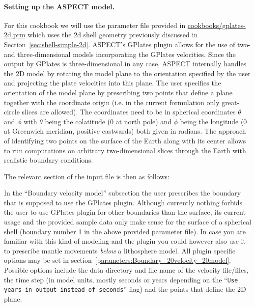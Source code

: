 \documentclass{article}
\newcommand{\aspect}{\textsc{ASPECT}}
\begin{document}
\paragraph{Setting up the \aspect{} model.}

For this cookbook we will use the parameter file provided in
\url{cookbooks/gplates-2d.prm} which uses the 2d shell geometry previously
discussed in Section~\ref{sec:shell-simple-2d}. \aspect{}'s GPlates plugin
allows for the use of two- and three-dimensional models incorporating the
GPlates velocities. Since the output by GPlates is three-dimensional in any case,
\aspect{} internally handles the 2D model by rotating the model plane to the
orientation specified by the user and projecting the plate velocities into this plane. The
user specifies the orientation of the model plane by prescribing two points that
define a plane together with the coordinate origin (i.e. in the current
formulation only great-circle slices are allowed). The coordinates need to be in
spherical coordinates $\theta$ and $\phi$ with $\theta$ being the colatitude (0
at north pole) and $\phi$ being the longitude (0 at Greenwich meridian, positive
eastwards) both given in radians.
The approach of identifying two points on the surface of the Earth along with
its center allows to run computations on arbitrary two-dimensional slices
through the Earth with realistic boundary conditions.

The relevant section of the input file is then as follows:



In the ``Boundary velocity model'' subsection the user prescribes the boundary that is supposed to
use the GPlates plugin. Although currently nothing forbids the user to use GPlates plugin for other
boundaries than the surface, its current usage and the provided sample data only make sense
for the surface of a spherical shell (boundary number 1 in the above provided parameter file). 
In case you are familiar with this kind of modeling and the plugin you could however also use it to prescribe mantle
movements \textit{below} a lithosphere model. All plugin specific options may be set in 
section~\ref{parameters:Boundary_20velocity_20model}. Possible options include the data directory
and file name of the velocity file/files, the time step (in model units, mostly seconds or years depending on the 
``\texttt{Use years in output instead of seconds}'' flag) and the points that define the 2D plane.
\end{document}
